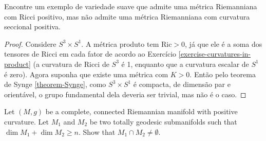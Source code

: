 \begin{exercise}
\label{exercise-positive-Ricci-but-no-positive-sectional}
Encontre um exemplo de variedade suave que admite uma métrica Riemanniana com
Ricci positivo, mas não admite uma métrica Riemanniana com curvatura seccional
positiva.
\end{exercise}

\begin{proof}
Considere $S^3\times S^1$. A métrica produto tem $\text{Ric}>0$, já que ele é a
soma dos tensores de Ricci em cada fator de acordo ao Exercício 
\ref{exercise-curvatures-in-product} (a curvatura de Ricci de $S^3$ é 1, 
enquanto que a curvatura escalar de $S^1$ é zero). Agora suponha que existe uma
 métrica com $K>0$. Então pelo teorema de Synge \ref{theorem-Synge}, como
$S^3\times S^1$ é compacta, de dimensão par e orientável, o grupo fundamental
dela deveria ser trivial, mas não é o caso.
\end{proof}

\begin{exercise}
\label{exercise-two-totally-geodesic-submanifolds}
Let $(M,g)$ be a complete, connected Riemannian manifold with positive
curvature. Let $M_1$ and $M_2$ be two totally geodesic submanifolds such that
$\dim M_1+\dim M_2\geq n$. Show that $M_1\cap M_2\neq \emptyset$.
\end{exercise}

